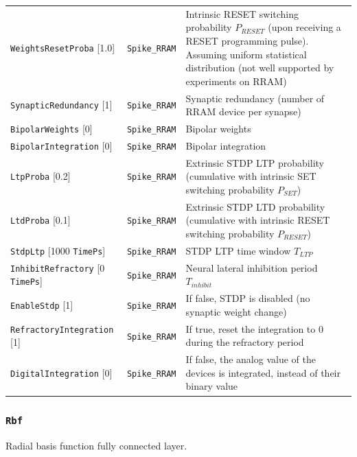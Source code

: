 \documentclass[a4paper,11pt,oneside]{article}
\newcommand{\iponly}{\reversemarginpar
    \marginnote{\color{listletiblue}\normalfont\scriptsize
    {\ttfamily{}\hyperref[sec:N2D2-IP]{\color{listletiblue}N2D2 IP}} \emph{only}}}
\begin{document}
\begin{center}
\begin{longtable}{| p{4cm} | p{3cm} | p{9cm} | }
  \lstinline!WeightsResetProba! [1.0] & \lstinline!Spike_RRAM!
    & Intrinsic RESET switching probability $P_{RESET}$ (upon receiving a RESET
    programming pulse). Assuming uniform statistical distribution (not well
    supported by experiments on RRAM) \\
  \lstinline!SynapticRedundancy! [1] & \lstinline!Spike_RRAM!
    & Synaptic redundancy (number of RRAM device per synapse) \\
  \cellcolor{expercolor}\lstinline!BipolarWeights! [0] & \lstinline!Spike_RRAM!
    & Bipolar weights \\
  \cellcolor{expercolor}\lstinline!BipolarIntegration! [0]
    & \lstinline!Spike_RRAM! & Bipolar integration \\
  \cellcolor{expercolor}\lstinline!LtpProba! [0.2] & \lstinline!Spike_RRAM!
    & Extrinsic STDP LTP probability (cumulative with intrinsic SET switching
    probability $P_{SET}$) \\
  \cellcolor{expercolor}\lstinline!LtdProba! [0.1] & \lstinline!Spike_RRAM!
    & Extrinsic STDP LTD probability (cumulative with intrinsic RESET switching
    probability $P_{RESET}$) \\
  \cellcolor{expercolor}\lstinline!StdpLtp! [1000 \lstinline!TimePs!]
    & \lstinline!Spike_RRAM! & STDP LTP time window $T_{LTP}$ \\
  \cellcolor{expercolor}\lstinline!InhibitRefractory! [0 \lstinline!TimePs!]
    & \lstinline!Spike_RRAM! & Neural lateral inhibition period $T_{inhibit}$ \\
  \cellcolor{expercolor}\lstinline!EnableStdp! [1] & \lstinline!Spike_RRAM!
    & If false, STDP is disabled (no synaptic weight change) \\
  \cellcolor{expercolor}\lstinline!RefractoryIntegration! [1]
    & \lstinline!Spike_RRAM! & If true, reset the integration to 0 during the
    refractory period \\
  \cellcolor{expercolor}\lstinline!DigitalIntegration! [0]
    & \lstinline!Spike_RRAM! & If false, the analog value of the devices is
    integrated, instead of their binary value \\
 \hline
\end{longtable}
\end{center}


\subsubsection{\texorpdfstring{%
\lstinline[basicstyle=\ttfamily\bfseries]!Rbf!\protect\iponly}{Rbf}}
Radial basis function fully connected layer.
\end{document}
